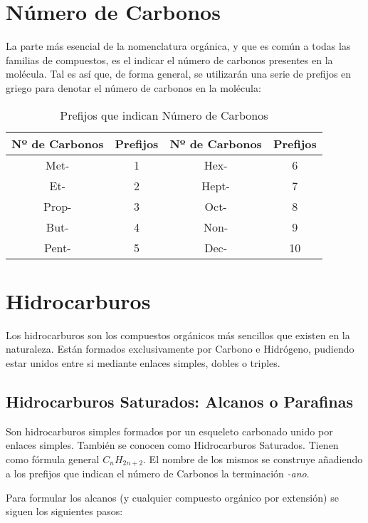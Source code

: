 \section{Número de Carbonos}
La parte más esencial de la nomenclatura orgánica, y que es común a todas las familias de compuestos, es el indicar el número de carbonos presentes en la molécula. Tal es así que, de forma general, se utilizarán una serie de prefijos en griego para denotar el número de carbonos en la molécula:
\begin{table}[h!]
	\centering
	\begin{tabular}{c|c||c|c}
		\textbf{Nº de Carbonos}&\textbf{Prefijos}&\textbf{Nº de Carbonos}&\textbf{Prefijos}\\ \hline
		Met-&1&Hex-&6\\
		Et-&2&Hept-&7\\
		Prop-&3&Oct-&8\\
		But-&4&Non-&9\\
		Pent-&5&Dec-&10\\ \hline
	\end{tabular}
\caption{Prefijos que indican Número de Carbonos}
\end{table}

\section{Hidrocarburos}
Los hidrocarburos son los compuestos orgánicos más sencillos que existen en la naturaleza. Están formados exclusivamente por Carbono e Hidrógeno, pudiendo estar unidos entre si mediante enlaces simples, dobles o triples.
\subsection{Hidrocarburos Saturados: Alcanos o Parafinas}
Son hidrocarburos simples formados por un esqueleto carbonado unido por enlaces simples. También se conocen como Hidrocarburos Saturados. Tienen como fórmula general $C_nH_{2n+2}$. El nombre de los mismos se construye añadiendo a los prefijos que indican el número de Carbonos la terminación \emph{-ano}.

\begin{figure}[h!]
	\centering
	\hspace{1cm}
\end{figure}
Para formular los alcanos (y cualquier compuesto orgánico por extensión) se siguen los siguientes pasos:\\

